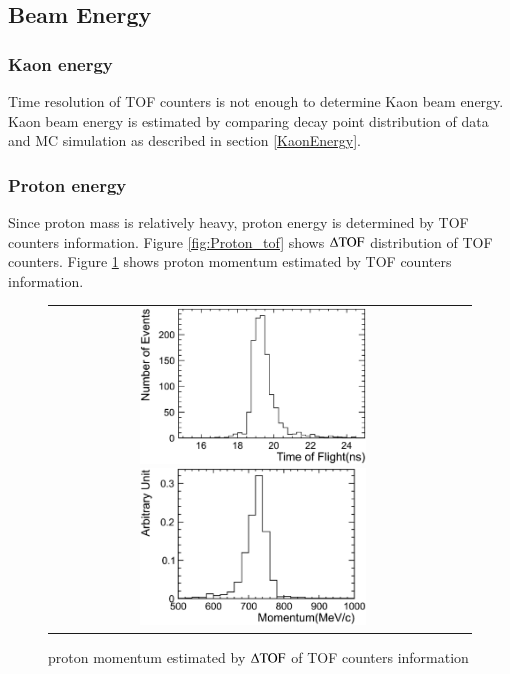    \subsection{Beam Energy}
   \subsubsection{Kaon energy}\label{kaon_energy_section}
   
   Time resolution of TOF counters is not enough to determine Kaon beam energy.
   Kaon beam energy is estimated by comparing decay point distribution of data and MC simulation as described in section \ref{KaonEnergy}.
   
   \subsubsection{Proton energy}\label{proton_energy_section}
   Since proton mass is relatively heavy, proton energy is determined by TOF counters information.
   Figure \ref{fig:Proton_tof} shows $\rm {\Delta TOF}$ distribution of TOF counters.
   Figure \ref{fig:Proton_momentum} shows proton momentum estimated by TOF counters information.

   \begin{figure}[htbp]
     \begin{tabular}{cc}
       \begin{minipage}{0.5\hsize}
         \centering
         \includegraphics[width=6cm,clip]{fig/TOF_proton.eps}
         \caption{$\rm {\Delta TOF}$ distribution of TOF counters with proton data}
         \label{fig:Proton_tof}
       \end{minipage}
       \begin{minipage}{0.5\hsize}
         \centering
         \includegraphics[width=6cm,clip]{fig/Momentum_proton.eps}
         \caption{proton momentum estimated by $\rm {\Delta TOF}$ of TOF counters information}
         \label{fig:Proton_momentum}
       \end{minipage}
     \end{tabular}
   \end{figure} 
   
